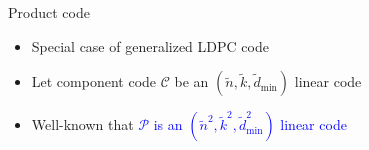 %
%
%

\begin{frame}{Product code}
\begin{itemize}
\item Special case of generalized LDPC code
\item Let component code $\mathcal{C}$ be an $(\tilde{n},\tilde{k},\tilde{d}_{\text{min}})$ linear code
\item Well-known that \textcolor{blue}{$\mathcal{P}$ is an $(\tilde{n}^{2},\tilde{k}^{2},\tilde{d}_{\text{min}}^{2})$
linear code }
\end{itemize}

\begin{center}
\scalebox{0.8}{}
\end{center}
\end{frame}

